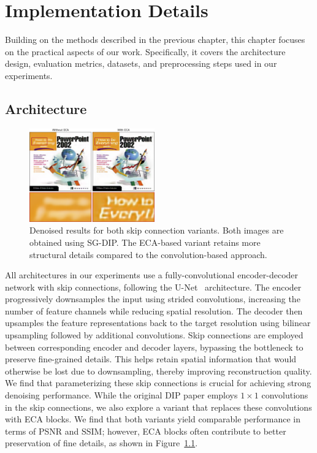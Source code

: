 \chapter{Implementation Details}

Building on the methods described in the previous chapter, this chapter focuses on the practical aspects of our work.
Specifically, it covers the architecture design, evaluation metrics, datasets, and preprocessing steps used in our experiments.

\section{Architecture}

\begin{figure}
    \vspace{-12pt}
    \centering
    \includegraphics[width=0.48\textwidth]{img/fig_5.1.png}
    \caption{
        Denoised results for both skip connection variants.
        Both images are obtained using SG-DIP\@.
        The ECA-based variant retains more structural details compared to the convolution-based approach.
    }\label{fig:ECA}
\end{figure}
All architectures in our experiments use a fully-convolutional encoder-decoder network with skip connections, following the U-Net~\cite{U-Net} architecture.
The encoder progressively downsamples the input using strided convolutions, increasing the number of feature channels while reducing spatial resolution.
The decoder then upsamples the feature representations back to the target resolution using bilinear upsampling followed by additional convolutions.
Skip connections are employed between corresponding encoder and decoder layers, bypassing the bottleneck to preserve fine-grained details.
This helps retain spatial information that would otherwise be lost due to downsampling, thereby improving reconstruction quality.
We find that parameterizing these skip connections is crucial for achieving strong denoising performance.
While the original DIP paper employs $1 \times 1$ convolutions in the skip connections, we also explore a variant that replaces these convolutions with ECA blocks.
We find that both variants yield comparable performance in terms of PSNR and SSIM\@; however, ECA blocks often contribute to better preservation of fine details, as shown in Figure~\ref{fig:ECA}.

